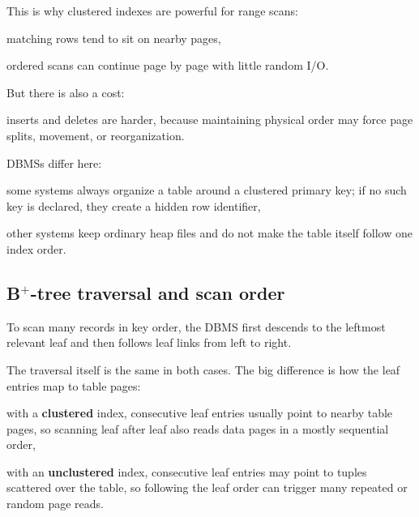 \documentclass[../../dis.tex]{subfiles}
\begin{document}
This is why clustered indexes are powerful for range scans:
\begin{dashlist}
    \item matching rows tend to sit on nearby pages,
    \item ordered scans can continue page by page with little random I/O.
\end{dashlist}

But there is also a cost:
\begin{dashlist}
    \item inserts and deletes are harder, because maintaining physical order may force page splits, movement, or reorganization.
\end{dashlist}

DBMSs differ here:
\begin{dashlist}
    \item some systems always organize a table around a clustered primary key; if no such key is declared, they create a hidden row identifier,
    \item other systems keep ordinary heap files and do not make the table itself follow one index order.
\end{dashlist}

\subsection{B\texorpdfstring{$^+$}{+}-tree traversal and scan order}
To scan many records in key order, the DBMS first descends to the leftmost relevant leaf and then follows leaf links from left to right.

\begin{schema}
{}\par}
\end{schema}

The traversal itself is the same in both cases. The big difference is how the leaf entries map to table pages:
\begin{dashlist}
    \item with a \textbf{clustered} index, consecutive leaf entries usually point to nearby table pages, so scanning leaf after leaf also reads data pages in a mostly sequential order,
    \item with an \textbf{unclustered} index, consecutive leaf entries may point to tuples scattered over the table, so following the leaf order can trigger many repeated or random page reads.
\end{dashlist}
\end{document}
